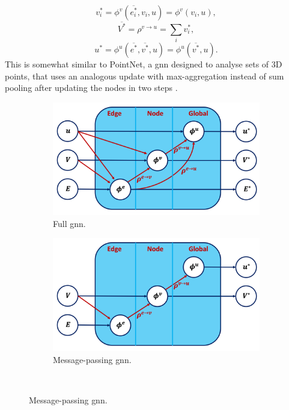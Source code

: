 \[v^*_i = \phi^v(\overline{e^*_i}, v_i, u) = \phi^v(v_i, u),\] 
\[\overline{V^*} = \rho^{v \rightarrow u} = \sum_i v^*_i,\] 
\[u^* = \phi^u(\overline{e^*}, \overline{v^*}, u) = \phi^u( \overline{v^*}, u).\] This is somewhat similar to PointNet, a \gls{gnn} designed to analyse sets of 3D points, that uses an analogous update with max-aggregation instead of sum pooling after updating the nodes in two steps \cite{pointNet}.  

\begin{figure}[h!]
    \centering
    \begin{subfigure}[b]{0.49\textwidth}
        \centering
        \includegraphics[scale=0.43]{Images/ML/fullGNN.png}
        \caption{Full \gls{gnn}.} 
        \label{fig:diverseGNNfull}
    \end{subfigure}
    \hfill
    \begin{subfigure}[b]{0.49\textwidth}
        \centering
        \includegraphics[scale=0.43]{Images/ML/messagepassingNN.png}
        \caption{Message-passing \gls{gnn}.} 
        \label{fig:pullsFTAGmp}
    \end{subfigure}
    \\  %

\end{figure}
